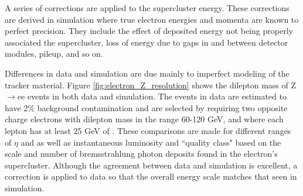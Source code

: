     A series of corrections are applied to the supercluster energy. These corrections are derived in simulation where true electron energies and momenta are known to perfect precision. They include the effect of deposited energy not being properly associated the supercluster, loss of energy due to gaps in and between detector modules, pileup, and so on.\cite[sec 4.8]{Electron_reco} 

    Differences in data and simulation are due mainly to imperfect modeling of the tracker material. Figure \ref{fig:electron_Z_resolution} shows the dilepton mass of Z$\to$ee events in both data and simulation. The events in data are estimated to have 2\% background contamination\cite[sec. 4.5.1]{ecal_energy_reco} and are selected by requiring two opposite charge electrons with dilepton mass in the range 60-120 GeV, and where each lepton has at least 25 GeV of \pt. These comparisons are made for different ranges of $\eta$ and \pt as well as instantaneous luminosity and ``quality class" based on the scale and number of bremsstrahlung photon deposits found in the electron's supercluster. Although the agreement between data and simulation is excellent, a correction is applied to data so that the overall energy scale matches that seen in simulation.

